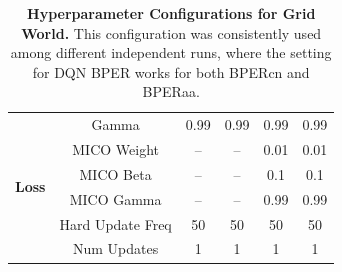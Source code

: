\begin{table}[H]
\begin{tabular}{@{} lccccc @{}}
\multirow{6}{*}{\textbf{Loss}} 
& Gamma & 0.99 & 0.99 & 0.99 & 0.99 \\ 
& MICO Weight & -- & -- & 0.01 & 0.01 \\ 
& MICO Beta & -- & -- & 0.1 & 0.1 \\ 
& MICO Gamma & -- & -- & 0.99 & 0.99 \\ 
& Hard Update Freq & 50 & 50 & 50 & 50 \\ 
& Num Updates & 1 & 1 & 1 & 1 \\ 
\bottomrule

\end{tabular}
\caption[Hyperparameter Configurations for Grid World]{\textbf{Hyperparameter Configurations for Grid World.} This configuration was consistently used among different independent runs, where the setting for DQN BPER works for both BPERcn and BPERaa.}
\end{table}


